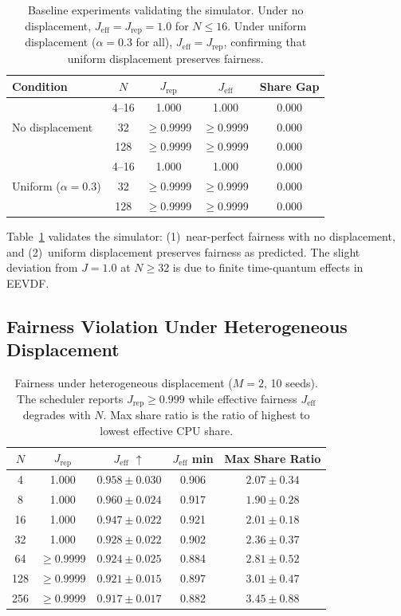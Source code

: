 \documentclass{article}
\newcommand{\displacement}{\alpha}
\newcommand{\jeff}{J_{\mathrm{eff}}}
\newcommand{\jrep}{J_{\mathrm{rep}}}
\begin{document}
\begin{table}[t]
\caption{Baseline experiments validating the simulator. Under no displacement, $\jeff = \jrep = 1.0$ for $N \leq 16$. Under uniform displacement ($\displacement = 0.3$ for all), $\jeff = \jrep$, confirming that uniform displacement preserves fairness.}
\label{tab:baselines}
\centering
\begin{tabular}{lcccc}
\toprule
Condition & $N$ & $\jrep$ & $\jeff$ & Share Gap \\
\midrule
\multirow{3}{*}{No displacement} & 4--16 & 1.000 & 1.000 & 0.000 \\
 & 32 & $\geq$0.9999 & $\geq$0.9999 & 0.000 \\
 & 128 & $\geq$0.9999 & $\geq$0.9999 & 0.000 \\
\midrule
\multirow{3}{*}{Uniform ($\displacement=0.3$)} & 4--16 & 1.000 & 1.000 & 0.000 \\
 & 32 & $\geq$0.9999 & $\geq$0.9999 & 0.000 \\
 & 128 & $\geq$0.9999 & $\geq$0.9999 & 0.000 \\
\bottomrule
\end{tabular}
\end{table}

Table~\ref{tab:baselines} validates the simulator: (1)~near-perfect fairness with no displacement, and (2)~uniform displacement preserves fairness as predicted. The slight deviation from $J = 1.0$ at $N \geq 32$ is due to finite time-quantum effects in EEVDF.

\subsection{Fairness Violation Under Heterogeneous Displacement}

\begin{table}[t]
\caption{Fairness under heterogeneous displacement ($M = 2$, 10 seeds). The scheduler reports $\jrep \geq 0.999$ while effective fairness $\jeff$ degrades with $N$. Max share ratio is the ratio of highest to lowest effective CPU share.}
\label{tab:fairness}
\centering
\begin{tabular}{ccccc}
\toprule
$N$ & $\jrep$ & $\jeff$ $\uparrow$ & $\jeff$ min & Max Share Ratio \\
\midrule
4 & 1.000 & $0.958 \pm 0.030$ & 0.906 & $2.07 \pm 0.34$ \\
8 & 1.000 & $0.960 \pm 0.024$ & 0.917 & $1.90 \pm 0.28$ \\
16 & 1.000 & $0.947 \pm 0.022$ & 0.921 & $2.01 \pm 0.18$ \\
32 & 1.000 & $0.928 \pm 0.022$ & 0.902 & $2.36 \pm 0.37$ \\
64 & $\geq$0.9999 & $0.924 \pm 0.025$ & 0.884 & $2.81 \pm 0.52$ \\
128 & $\geq$0.9999 & $0.921 \pm 0.015$ & 0.897 & $3.01 \pm 0.47$ \\
256 & $\geq$0.9999 & $\mathbf{0.917 \pm 0.017}$ & 0.882 & $3.45 \pm 0.88$ \\
\bottomrule
\end{tabular}
\end{table}
\end{document}
